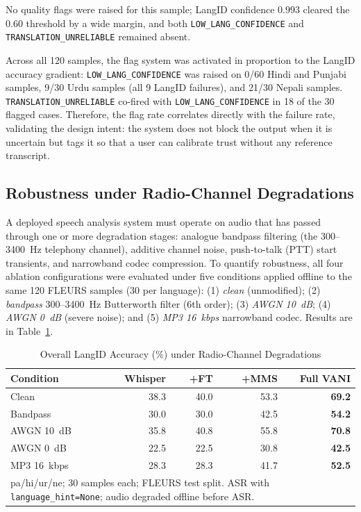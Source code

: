 \documentclass[conference]{IEEEtran}
\begin{document}
No quality flags were raised for this sample; LangID confidence 0.993 cleared the 0.60 threshold by a wide margin, and both \texttt{LOW\_LANG\_CONFIDENCE} and \texttt{TRANSLATION\_UNRELIABLE} remained absent.

Across all 120 samples, the flag system was activated in proportion to the LangID accuracy gradient: \texttt{LOW\_LANG\_CONFIDENCE} was raised on 0/60 Hindi and Punjabi samples, 9/30 Urdu samples (all 9 LangID failures), and 21/30 Nepali samples. \texttt{TRANSLATION\_UNRELIABLE} co-fired with \texttt{LOW\_LANG\_CONFIDENCE} in 18 of the 30 flagged cases. Therefore, the flag rate correlates directly with the failure rate, validating the design intent: the system does not block the output when it is uncertain but tags it so that a user can calibrate trust without any reference transcript.

\subsection{Robustness under Radio-Channel Degradations}
\label{sec:robustness}

A deployed speech analysis system must operate on audio that has passed through one or more degradation stages: analogue bandpass filtering (the 300--3400~Hz telephony channel), additive channel noise, push-to-talk (PTT) start transients, and narrowband codec compression. To quantify robustness, all four ablation configurations were evaluated under five conditions applied offline to the same 120 FLEURS samples (30 per language): (1) \textit{clean} (unmodified); (2) \textit{bandpass} 300--3400~Hz Butterworth filter (6th order); (3) \textit{AWGN 10~dB}; (4) \textit{AWGN 0~dB} (severe noise); and (5) \textit{MP3 16~kbps} narrowband codec. Results are in Table~\ref{tab:robustness}.

\begin{table}[htbp]
\caption{Overall LangID Accuracy (\%) under Radio-Channel Degradations}
\label{tab:robustness}
\begin{center}
\begin{tabular}{lrrrr}
\toprule
\textbf{Condition} & \textbf{Whisper} & \textbf{+FT} & \textbf{+MMS} & \textbf{Full VANI} \\
\midrule
Clean          & 38.3 & 40.0 & 53.3 & \textbf{69.2} \\
Bandpass       & 30.0 & 30.0 & 42.5 & \textbf{54.2} \\
AWGN 10~dB     & 35.8 & 40.8 & 55.8 & \textbf{70.8} \\
AWGN 0~dB      & 22.5 & 22.5 & 30.8 & \textbf{42.5} \\
MP3 16~kbps    & 28.3 & 28.3 & 41.7 & \textbf{52.5} \\
\midrule
\multicolumn{5}{p{8cm}}{\footnotesize pa/hi/ur/ne; 30 samples each; FLEURS test split. ASR with \texttt{language\_hint=None}; audio degraded offline before ASR.} \\
\bottomrule
\end{tabular}
\end{center}
\end{table}
\end{document}

